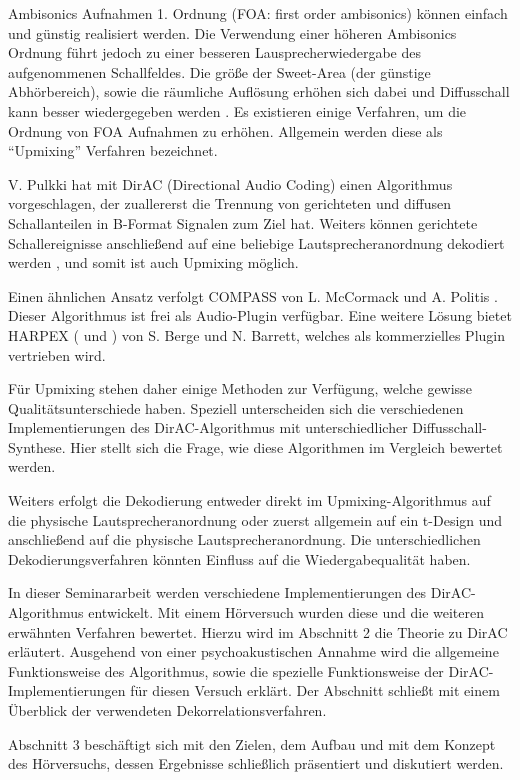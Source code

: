 Ambisonics Aufnahmen 1. Ordnung (FOA: first order ambisonics) können einfach und günstig realisiert werden. 
Die Verwendung einer höheren Ambisonics Ordnung führt jedoch zu einer besseren Lausprecherwiedergabe des aufgenommenen Schallfeldes.
Die größe der Sweet-Area (der günstige Abhörbereich), sowie die räumliche Auflösung erhöhen sich dabei und Diffusschall kann besser wiedergegeben werden \cite{ambi-book}.
Es existieren einige Verfahren, um die Ordnung von FOA Aufnahmen zu erhöhen.
Allgemein werden diese als ``Upmixing'' Verfahren bezeichnet.

V. Pulkki hat mit DirAC (Directional Audio Coding) \cite{pulkki} einen Algorithmus vorgeschlagen, der zuallererst die Trennung von gerichteten und diffusen Schallanteilen in B-Format Signalen zum Ziel hat. Weiters können gerichtete Schallereignisse anschließend auf eine beliebige Lautsprecheranordnung dekodiert werden \cite{spatial-book}, und somit ist auch Upmixing möglich.

Einen ähnlichen Ansatz verfolgt COMPASS von L. McCormack und A. Politis \cite{compy}. Dieser Algorithmus ist frei als Audio-Plugin verfügbar.
Eine weitere Lösung bietet HARPEX (\cite{harpy2} und \cite{harpy}) von S. Berge und N. Barrett, welches als kommerzielles Plugin vertrieben wird.

Für Upmixing stehen daher einige Methoden zur Verfügung, welche gewisse Qualitätsunterschiede haben.
Speziell unterscheiden sich die verschiedenen Implementierungen des DirAC-Algorithmus mit unterschiedlicher Diffusschall-Synthese.
Hier stellt sich die Frage, wie diese Algorithmen im Vergleich bewertet werden.

Weiters erfolgt die Dekodierung entweder direkt im Upmixing-Algorithmus auf die physische Lautsprecheranordnung oder zuerst allgemein auf ein t-Design und anschließend auf die physische Lautsprecheranordnung. Die unterschiedlichen Dekodierungsverfahren könnten Einfluss auf die Wiedergabequalität haben.

In dieser Seminararbeit werden verschiedene Implementierungen des DirAC-Algorithmus entwickelt.
Mit einem Hörversuch wurden diese und die weiteren erwähnten Verfahren bewertet.
Hierzu wird im Abschnitt 2 die Theorie zu DirAC erläutert.
Ausgehend von einer psychoakustischen Annahme wird die allgemeine Funktionsweise des Algorithmus, sowie die spezielle Funktionsweise der DirAC-Implementierungen für diesen Versuch erklärt.
Der Abschnitt schließt mit einem Überblick der verwendeten Dekorrelationsverfahren.

Abschnitt 3 beschäftigt sich mit den Zielen, dem Aufbau und mit dem Konzept des Hörversuchs, dessen Ergebnisse schließlich präsentiert und diskutiert werden.
